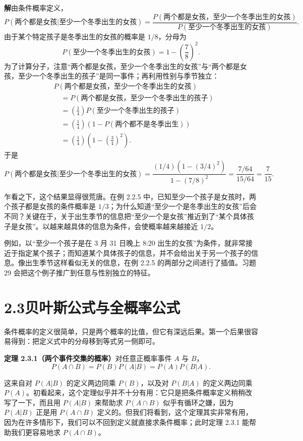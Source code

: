 \documentclass[UTF8, 12pt, fontset=fandol, oneside]{ctexart}
\begin{document}
\noindent\textbf{解}\quad 由条件概率定义，
\[
  P(\text{两个都是女孩}|\text{至少一个冬季出生的女孩})
  =
  \frac{P(\text{两个都是女孩，至少一个冬季出生的女孩})}
       {P(\text{至少一个冬季出生的女孩})}.
\]
由于某个特定孩子是冬季出生的女孩的概率是 $1/8$，分母为
\[
  P(\text{至少一个冬季出生的女孩})=1-\left(\frac78\right)^2.
\]
为了计算分子，注意“两个都是女孩，至少一个冬季出生的女孩”与“两个都是女孩，至少一个冬季出生的孩子”是同一事件；再利用性别与季节独立：
\[
\begin{aligned}
  &P(\text{两个都是女孩，至少一个冬季出生的女孩}) \\
  &\quad =
  P(\text{两个都是女孩，至少一个冬季出生的孩子}) \\
  &\quad =
  \left(\frac14\right)P(\text{至少一个冬季出生的孩子}) \\
  &\quad =
  \left(\frac14\right)\left(1-P(\text{两个都不是冬季出生})\right) \\
  &\quad =
  \left(\frac14\right)\left(1-\left(\frac34\right)^2\right).
\end{aligned}
\]
于是
\[
  P(\text{两个都是女孩}|\text{至少一个冬季出生的女孩})
  =
  \frac{(1/4)(1-(3/4)^2)}{1-(7/8)^2}
  =
  \frac{7/64}{15/64}
  =
  \frac{7}{15}.
\]

乍看之下，这个结果显得很荒唐。在例 2.2.5 中，已知至少一个孩子是女孩时，两个孩子都是女孩的条件概率是 $1/3$；为什么知道“至少一个是冬季出生的女孩”后会不同？关键在于，关于出生季节的信息把“至少一个是女孩”推近到了“某个具体孩子是女孩”。以越来越具体的信息为条件，会使概率越来越接近 $1/2$。

例如，以“至少一个孩子是在 3 月 31 日晚上 8:20 出生的女孩”为条件，就非常接近于指定某个孩子；而知道某个具体孩子的信息，并不会给出关于另一个孩子的信息。像出生季节这样看似无关的信息，在例 2.2.5 的两部分之间进行了插值。习题 29 会把这个例子推广到任意与性别独立的特征。

\section*{2.3\quad 贝叶斯公式与全概率公式}

条件概率的定义很简单，只是两个概率的比值，但它有深远后果。第一个后果很容易得到：把定义式中的分母移到等式另一侧即可。

\noindent\textbf{定理 2.3.1（两个事件交集的概率）}\quad 对任意正概率事件 $A$ 与 $B$，
\[
  P(A\cap B)=P(B)P(A|B)=P(A)P(B|A).
\]

这来自对 $P(A|B)$ 的定义两边同乘 $P(B)$，以及对 $P(B|A)$ 的定义两边同乘 $P(A)$。初看起来，这个定理似乎并不十分有用：它只是把条件概率定义稍稍改写了一下，而且用 $P(A|B)$ 来帮助求 $P(A\cap B)$ 似乎有循环之嫌，因为 $P(A|B)$ 正是用 $P(A\cap B)$ 定义的。但我们将看到，这个定理其实非常有用，因为在许多情形下，我们可以不回到定义就直接求条件概率；此时定理 2.3.1 能帮助我们更容易地求 $P(A\cap B)$。
\end{document}
